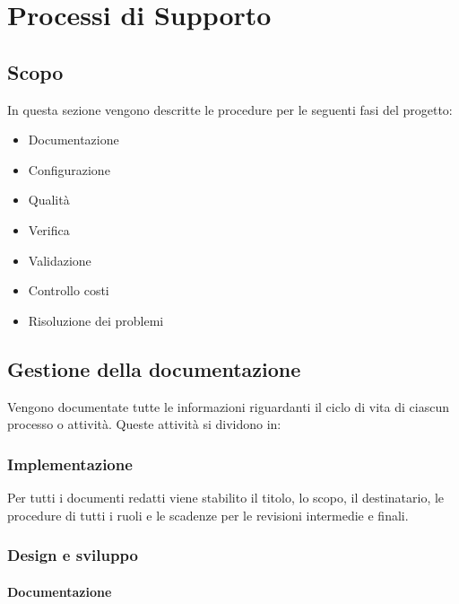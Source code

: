 \section{Processi di Supporto}
\subsection{Scopo} In questa sezione vengono descritte le procedure per le seguenti fasi del progetto:
\begin{itemize}
    \item {Documentazione}
    \item {Configurazione}
    \item {Qualità}
    \item {Verifica}
    \item {Validazione}
    \item {Controllo costi}
    \item {Risoluzione dei problemi}
\end{itemize}
\subsection{Gestione della documentazione}
    Vengono documentate tutte le informazioni riguardanti il ciclo di vita di ciascun processo o attività.
    Queste attività si dividono in:
    \subsubsection{Implementazione} 
    Per tutti i documenti redatti viene stabilito il titolo, lo scopo, il destinatario, le procedure di tutti i ruoli e le scadenze per le revisioni intermedie e finali.
    \subsubsection{Design e sviluppo} 
        \paragraph{Documentazione} ~

